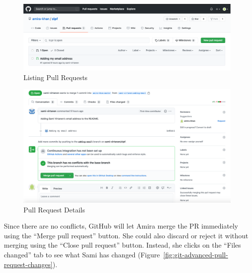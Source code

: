 \documentclass[
]{krantz}
\begin{document}
\begin{figure}

{\centering \includegraphics[width=1\linewidth]{figures/git-advanced/pr-list} 

}

\caption{Listing Pull Requests}\label{fig:git-advanced-pull-request-list}
\end{figure}

\begin{figure}

{\centering \includegraphics[width=1\linewidth]{figures/git-advanced/pr-details} 

}

\caption{Pull Request Details}\label{fig:git-advanced-pull-request-details}
\end{figure}

Since there are no conflicts,
GitHub will let Amira merge the PR immediately using the ``Merge pull request'' button.
She could also discard or reject it without merging using the ``Close pull request'' button.
Instead,
she clicks on the ``Files changed'' tab to see what Sami has changed
(Figure~\ref{fig:git-advanced-pull-request-changes}).
\end{document}
